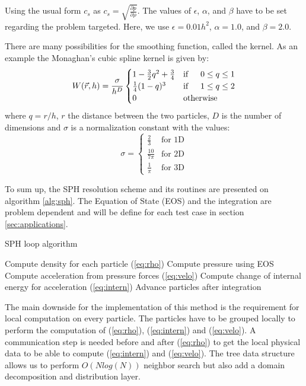 Using the usual form $c_s$ as $c_s = \sqrt{\frac{\partial p}{\partial \rho}}$.
The values of $\epsilon$, $\alpha$, and $\beta$ have to be set regarding the problem targeted. 
Here, we use $\epsilon = 0.01h^2$, $\alpha = 1.0$, and $\beta = 2.0$. 

There are many possibilities for the smoothing function, called the kernel. 
As an example the Monaghan's cubic spline kernel is given by:
\begin{equation}
W(\vec{r},h) = \frac{\sigma}{h^D} \begin{cases}
1-\frac{3}{2} q^2 + \frac{3}{4} & \text{if} \indent 0 \leq q \leq 1 \\
\frac{1}{4} (1-q)^3  & \text{if} \indent 1 \leq q \leq 2 \\
0 & \text{otherwise}
\end{cases}
\end{equation}
where $q = r/h$, $r$ the distance between the two particles, $D$ is the number of dimensions and $\sigma$ is a normalization constant with the values:
\begin{equation}
\sigma =  \begin{cases}
\frac{2}{3} & \text{for 1D}  \\
\frac{10}{7 \pi} & \text{for 2D} \\
\frac{1}{\pi} & \text{for 3D}
\end{cases}
\end{equation}

To sum up, the SPH resolution scheme and its routines are presented on algorithm \ref{alg:sph}.
The Equation of State (EOS) and the integration are problem dependent and will be define for each test case in section \ref{sec:applications}. 

\begin{algorithm}
\caption{SPH loop algorithm}\label{alg:sph}
\begin{algorithmic}[1]
\State Compute density for each particle (\ref{eq:rho})
\State Compute pressure using EOS 
\State Compute acceleration from pressure forces (\ref{eq:velo})
\State Compute change of internal energy for acceleration (\ref{eq:intern})
\State Advance particles after integration
\EndWhile
\end{algorithmic}
\end{algorithm}

The main downside for the implementation of this method is the requirement for local computation on every particle. 
The particles have to be grouped locally to perform the computation of (\ref{eq:rho}), (\ref{eq:intern}) and (\ref{eq:velo}).
A communication step is needed before and after (\ref{eq:rho}) to get the local physical data to be able to compute (\ref{eq:intern}) and (\ref{eq:velo}).
The tree data structure allows us to perform $O(Nlog(N))$ neighbor search but also add a domain decomposition and distribution layer.

